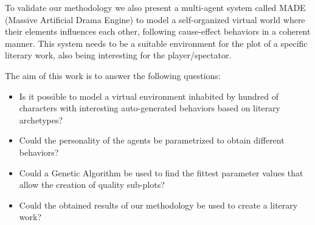 \documentclass{sig-alternate}
\begin{document}










To validate our methodology we also present a multi-agent system called
MADE (Massive Artificial Drama Engine) to model a self-organized
virtual world where their elements influences each other, following
cause-effect behaviors in a coherent manner. This system needs to be
a suitable environment for the plot of a specific literary work, also being
interesting for the player/spectator. 

The aim of this work is to answer the following questions:

\begin{itemize}
 \item Is it possible to model a virtual environment inhabited by hundred of characters with interesting auto-generated behaviors based on literary archetypes?
 \item Could the personality of the agents be parametrized to obtain different behaviors?
 \item Could a Genetic Algorithm be used to find the fittest parameter values that allow the creation of quality sub-plots?
 \item Could the obtained results of our methodology be used to create a literary work? %
\end{itemize}

\end{document}
